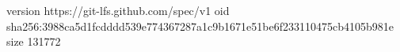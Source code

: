 version https://git-lfs.github.com/spec/v1
oid sha256:3988ca5d1fcdddd539e774367287a1c9b1671e51be6f233110475cb4105b981e
size 131772
